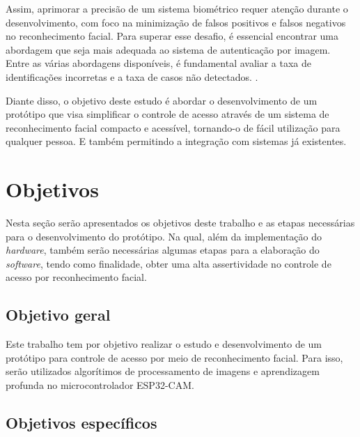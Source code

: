 Assim, aprimorar a precisão de um sistema biométrico requer atenção 
durante o desenvolvimento, com foco na minimização de falsos 
positivos e falsos negativos no reconhecimento facial. Para superar esse 
desafio, é essencial encontrar uma abordagem que seja mais adequada ao 
sistema de autenticação por imagem. Entre as várias abordagens disponíveis, 
é fundamental avaliar a taxa de identificações incorretas e a taxa de 
casos não detectados. \cite{viola2004}.


Diante disso, o objetivo deste estudo é abordar o desenvolvimento de um 
protótipo que visa simplificar o controle de acesso através de um sistema 
de reconhecimento facial compacto e acessível, tornando-o de fácil 
utilização para qualquer pessoa. E também permitindo a integração 
com sistemas já existentes. 

\section{Objetivos}\label{sec:objetivos}

Nesta seção serão apresentados os objetivos deste trabalho e as etapas necessárias 
para o desenvolvimento do protótipo. Na qual, além da implementação do 
\textit{hardware}, também serão necessárias algumas etapas para a elaboração do \textit{software}, 
tendo como finalidade, obter uma alta assertividade no controle de acesso por 
reconhecimento facial.

\subsection{Objetivo geral}\label{subsec:objetivoGeral}

Este trabalho tem por objetivo realizar o estudo e desenvolvimento de um protótipo 
para controle de acesso por meio de reconhecimento facial. Para isso, 
serão utilizados algorítimos de processamento de imagens e aprendizagem 
profunda no microcontrolador ESP32-CAM.

\subsection{Objetivos específicos}\label{subsec:objetivosEspecificos}

